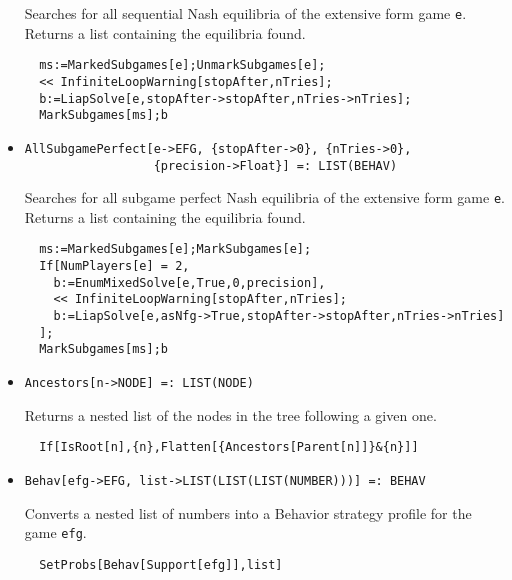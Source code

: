 \begin{itemize}
\bd 
Searches for all sequential Nash equilibria of the extensive form
game \verb+e+.  Returns a list containing the equilibria found.

\begin{verbatim}
  ms:=MarkedSubgames[e];UnmarkSubgames[e];
  << InfiniteLoopWarning[stopAfter,nTries];
  b:=LiapSolve[e,stopAfter->stopAfter,nTries->nTries];
  MarkSubgames[ms];b
\end{verbatim} 
\ed

\item{}
\protect \large \begin{verbatim}
AllSubgamePerfect[e->EFG, {stopAfter->0}, {nTries->0}, 
                  {precision->Float}] =: LIST(BEHAV) 
\end{verbatim}\normalsize

\bd 
Searches for all subgame perfect Nash equilibria of the extensive
form game \verb+e+.  Returns a list containing the equilibria found.

\begin{verbatim}
  ms:=MarkedSubgames[e];MarkSubgames[e];
  If[NumPlayers[e] = 2, 
    b:=EnumMixedSolve[e,True,0,precision],
    << InfiniteLoopWarning[stopAfter,nTries];
    b:=LiapSolve[e,asNfg->True,stopAfter->stopAfter,nTries->nTries]
  ];
  MarkSubgames[ms];b
\end{verbatim} 
\ed

\item{}
\protect \large \begin{verbatim}
Ancestors[n->NODE] =: LIST(NODE) 
\end{verbatim}\normalsize

\bd 
Returns a nested list of the nodes in the tree following a given one.  
\begin{verbatim}
  If[IsRoot[n],{n},Flatten[{Ancestors[Parent[n]]}&{n}]]
\end{verbatim} 
\ed



\item{}
\protect \large \begin{verbatim}
Behav[efg->EFG, list->LIST(LIST(LIST(NUMBER)))] =: BEHAV 
\end{verbatim}\normalsize

\bd 
Converts a nested list of numbers into a Behavior strategy
profile for the game \verb+efg+.
\begin{verbatim}
  SetProbs[Behav[Support[efg]],list]
\end{verbatim} 
\ed


\end{itemize}

